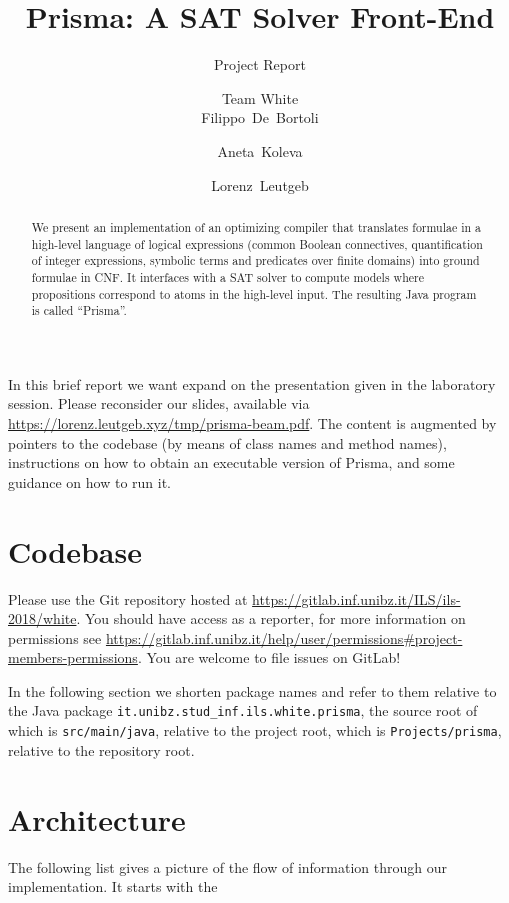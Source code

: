 \documentclass{llncs}
\title{Prisma: A SAT Solver Front-End}
\subtitle{Project Report}
\author{Team White\\[2mm]Filippo~De~Bortoli \and Aneta~Koleva \and Lorenz~Leutgeb}
\institute{Free University of Bozen-Bolzano\\[3mm] \texttt{\{\href{mailto:filippo.debortoli@stud-inf.unibz.it}{filippo.debortoli},\href{mailto:aneta.koleva@stud-inf.unibz.it}{aneta.koleva},\href{mailto:lorenz.leutgeb@stud-inf.unibz.it}{lorenz.leutgeb}\}\newline @stud-inf.unibz.it}}
\begin{document}
  \maketitle

  \begin{abstract}
We present an implementation of an optimizing compiler that translates formulae in a high-level language of logical expressions (common Boolean connectives, quantification of integer expressions, symbolic terms and predicates over finite domains) into ground formulae in CNF. It interfaces with a SAT solver to compute models where propositions correspond to atoms in the high-level input. The resulting Java program is called \enquote{Prisma}.
  \end{abstract}

%
%
%
%
%

In this brief report we want expand on the presentation given in the laboratory session. Please reconsider our slides, available via \url{https://lorenz.leutgeb.xyz/tmp/prisma-beam.pdf}. The content is augmented by pointers to the codebase (by means of class names and method names), instructions on how to obtain an executable version of Prisma, and some guidance on how to run it.

\section{Codebase}

Please use the Git repository hosted at \url{https://gitlab.inf.unibz.it/ILS/ils-2018/white}. You should have access as a reporter, for more information on permissions see \url{https://gitlab.inf.unibz.it/help/user/permissions#project-members-permissions}. You are welcome to file issues on GitLab!

In the following section we shorten package names and refer to them relative to the Java package \texttt{it.unibz.stud\_inf.ils.white.prisma}, the source root of which is \texttt{src/main/java}, relative to the project root, which is \texttt{Projects/prisma}, relative to the repository root.

\section{Architecture}

The following list gives a picture of the flow of information through our implementation. It starts with the 
\end{document}
